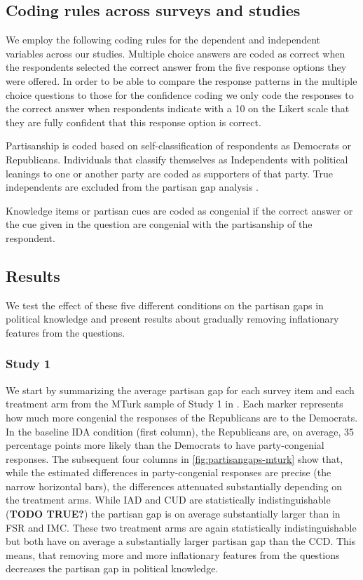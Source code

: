 \documentclass[12pt, letterpaper]{article}
\begin{document}
\subsection*{Coding rules across surveys and studies}


We employ the following coding rules for the dependent and independent variables across our studies. Multiple choice answers are coded as correct when the respondents selected the correct answer from the five response options they were offered. In order to be able to compare the response patterns in the multiple choice questions to those for the confidence coding we only code the responses to the correct answer when respondents indicate with a 10 on the Likert scale that they are fully confident that this response option is correct.

Partisanship is coded based on self-classification of respondents as Democrats or Republicans. Individuals that classify themselves as Independents with political leanings to one or another party are coded as supporters of that party. True independents are excluded from the partisan gap analysis \citep{Bullock2011, klar2016independent}.

Knowledge items or partisan cues are coded as congenial if the correct answer or the cue given in the question are congenial with the partisanship of the respondent.

\subsection*{Results}
We test the effect of these five different conditions on the partisan gaps in political knowledge and present results about gradually removing inflationary features from the questions.


\subsubsection*{Study 1}
We start by summarizing the average partisan gap for each survey item and each treatment arm from the MTurk sample of Study 1 in . Each marker represents how much more congenial the responses of the Republicans are to the Democrats. In the baseline IDA condition (first column), the Republicans are, on average, 35 percentage points more likely than the Democrats to have party-congenial responses. The subsequent four columns in \cref{fig:partisangaps-mturk} show that, while the estimated differences in party-congenial responses are precise (the narrow horizontal bars), the differences attenuated substantially depending on the treatment arms. While IAD and CUD are statistically indistinguishable (\textbf{TODO TRUE?}) the partisan gap is on average substantially larger than in FSR and IMC. These two treatment arms are again statistically indistinguishable but both have on average a substantially larger partisan gap than the CCD. This means, that removing more and more inflationary features from the questions decreases the partisan gap in political knowledge.
\end{document}
